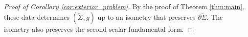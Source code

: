 \documentclass[12pt]{amsart}
\def\p{\partial}
\def\R{\mathbb R}
\DeclarePairedDelimiter\norm{\lVert}{\rVert}
\theoremstyle{definition}
\theoremstyle{remark}
\newcommand{\eps}{\epsilon}
\begin{document}
\begin{proof}[Proof of Corollary \ref{cor:exterior_problem}]
% 
% 
%
% 
%
 By the proof of Theorem \ref{thm:main}, these data determines $(\widetilde \Sigma, g)$ up to an isometry that preserves $\p \widetilde \Sigma$. The isometry also preserves the second scalar fundamental form. 
 

\end{proof}
\end{document}

